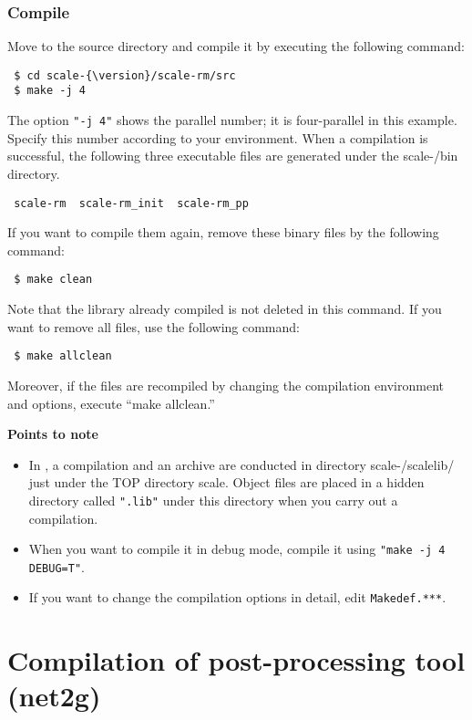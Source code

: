 \subsubsection{Compile} %

Move to the \scalerm source directory 
and compile it by executing the following command:
\begin{verbatim}
 $ cd scale-{\version}/scale-rm/src
 $ make -j 4
\end{verbatim}
The option \verb|"-j 4"| shows the parallel number;
it is four-parallel in this example.
Specify this number according to your environment.
When a compilation is successful, 
the following three executable files are generated under the scale-{\version}/bin directory.
\begin{verbatim}
 scale-rm  scale-rm_init  scale-rm_pp
\end{verbatim}

If you want to compile them again, remove these binary files by the following command:
\begin{verbatim}
 $ make clean
\end{verbatim}
Note that the library already compiled is not deleted in this command. If you want to remove all files, use the following command:
\begin{verbatim}
 $ make allclean
\end{verbatim}
Moreover, if the files are recompiled by changing the compilation environment and options, 
execute ``make allclean.''

{\bf Points to note}
\begin{itemize}
\item  In \scalelib, a compilation and an archive are conducted in directory scale-{\version}/scalelib/ just under the TOP directory scale. 
Object files are placed in a hidden directory called \verb|".lib"| under this directory when you carry out a compilation.
\item  When you want to compile it in debug mode, 
compile it using \verb|"make -j 4 DEBUG=T"|.
\item If you want to change the compilation options in detail, edit \verb|Makedef.***|.
\end{itemize}


\section{Compilation of post-processing tool (net2g)} \label{sec:source_net2g}

